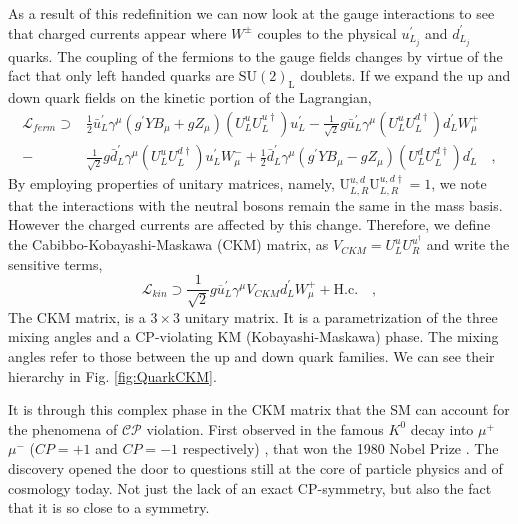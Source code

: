 \documentclass[10pt]{book}
\renewcommand{\(}{\left(}
\renewcommand{\)}{\right)}
\renewcommand{\[}{\left[}
\renewcommand{\]}{\right]}
\begin{document}
As a result of this redefinition we can now look at the gauge interactions to see that charged currents appear where $W^\pm$ couples to the physical $u^\prime_{L_j}$ and $d^\prime_{L_j}$ quarks. 
%
The coupling of the fermions to the gauge fields changes by virtue of the fact that only left handed quarks are $\mathrm{SU(2)_L}$ doublets. If we expand the up and down quark fields on the kinetic portion of the Lagrangian,
%
\begin{equation}
\label{LagFermFCCCs}
\begin{aligned}
\mathcal{L}_{ferm} \supset & 
\frac{1}{2} \bar{u}^\prime_L \gamma^\mu \left( g^\prime Y B_\mu + g Z_\mu  \right) \left(U^u_L U^{u \dagger}_L \right) u^\prime_L - \frac{1}{\sqrt{2}} g \bar{u}^\prime_L \gamma^\mu \left( U^u_L U^{d \dagger}_L \right) d^\prime_L W^+_\mu \\    
- 
& \frac{1}{\sqrt{2}} g \bar{d}^\prime_L \gamma^\mu \left( U^u_L U^{d \dagger}_L \right) u^\prime_L W^-_\mu 
+ 
\frac{1}{2} \bar{d}^\prime_L \gamma^\mu \left( g^\prime Y B_\mu - g Z_\mu \right) \left( U^d_L U^{d \dagger}_L \right) d^\prime_L \quad , 
\end{aligned}
\end{equation}
%
By employing properties of unitary matrices, namely, $ \mathrm{U}^{u,d}_{L,R} \mathrm{U}^{u,d \dagger}_{L,R} = 1$, we note that the interactions with the neutral bosons remain the same in the mass basis.
%
However the charged currents are affected by this change.
%
Therefore, we define the Cabibbo-Kobayashi-Maskawa (CKM) matrix, as $V_{CKM} = U^u_L U^{u ^\dagger }_R $ and write the sensitive terms,
%
\begin{equation}
\mathcal{L}_{kin} \supset \frac{1}{\sqrt{2}} g \overline{u}^\prime_L \gamma^\mu V_{CKM} d_L^\prime W^+_\mu + \text{H.c.} \quad , 
\end{equation}
%
The CKM matrix, is a $3 \times 3$ unitary matrix. It is a parametrization of the three mixing angles and a CP-violating KM (Kobayashi-Maskawa) phase. %
%
The mixing angles refer to those between the up and down quark families. We can see their hierarchy in Fig. \ref{fig:QuarkCKM}.

It is through this complex phase in the CKM matrix that the SM can account for the phenomena of $\mathcal{CP}$ violation.
%
First observed in the famous $K^0$ decay into $\mu^+$ $\mu^-$ ($CP=+1$ and $CP=-1$ respectively) \cite{PhysRevLett.13.138}, that won the 1980 Nobel Prize \cite{NobelPrize:1980-Physics}. 
%
The discovery opened the door to questions still at the core of particle physics and of cosmology today.
%
Not just the lack of an exact CP-symmetry, but also the fact that it is so close to a symmetry.
\end{document}
